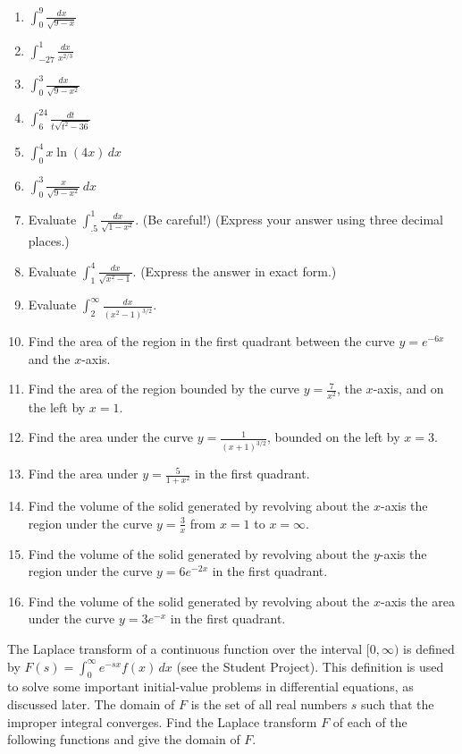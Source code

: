 \documentclass{exercises}
\begin{document}
\begin{enumerate}[resume]
\item $\int_{0}^{9}\frac{dx}{\sqrt{9-x}}$
\item $\int_{-27}^{1}\frac{dx}{x^{2/3}}$
\item $\int_{0}^{3}\frac{dx}{\sqrt{9-x^{2}}}$
\item $\int_{6}^{24}\frac{dt}{t\sqrt{t^{2}-36}}$
\item $\int_{0}^{4}x\ln(4x)\,dx$
\item $\int_{0}^{3}\frac{x}{\sqrt{9-x^{2}}}\,dx$
\item Evaluate $\int_{.5}^{1}\frac{dx}{\sqrt{1-x^{2}}}$. (Be careful!) (Express your answer using three decimal places.)
\item Evaluate $\int_{1}^{4}\frac{dx}{\sqrt{x^{2}-1}}$. (Express the answer in exact form.)
\item Evaluate $\int_{2}^{\infty}\frac{dx}{{(x^{2}-1)}^{3/2}}$.
\item Find the area of the region in the first quadrant between the curve $y=e^{-6x}$ and the $x$-axis.
\item Find the area of the region bounded by the curve $y=\frac{7}{x^{2}}$, the $x$-axis, and on the left by $x=1$.
\item Find the area under the curve $y=\frac{1}{{(x+1)}^{3/2}}$, bounded on the left by $x=3$.
\item Find the area under $y=\frac{5}{1+x^{2}}$ in the first quadrant.
\item Find the volume of the solid generated by revolving about the $x$-axis the region under the curve $y=\frac{3}{x}$ from $x=1$ to $x=\infty$.
\item Find the volume of the solid generated by revolving about the $y$-axis the region under the curve $y=6e^{-2x}$ in the first quadrant.
\item Find the volume of the solid generated by revolving about the $x$-axis the area under the curve $y=3e^{-x}$ in the first quadrant.
\end{enumerate}

The Laplace transform of a continuous function over the interval $[0,\infty)$ is defined by $F(s)=\int_{0}^{\infty}e^{-sx}f(x)\,dx$ (see the Student Project). This definition is used to solve some important initial-value problems in differential equations, as discussed later. The domain of $F$ is the set of all real numbers $s$ such that the improper integral converges. Find the Laplace transform $F$ of each of the following functions and give the domain of $F$.
\end{document}
